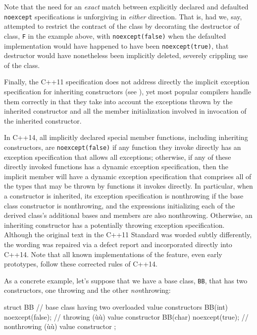\noindent Note that the need for an \emph{exact} match between explicitly declared
and defaulted \lstinline!noexcept! specifications is unforgiving in
\emph{either} direction. That is, had we, say, attempted to restrict the
contract of the class by decorating the destructor of class, \lstinline!F!
in the example above, with \lstinline!noexcept(false)! when the defaulted
implementation would have happened to have been \lstinline!noexcept(true)!,
that destructor would have nonetheless been implicitly deleted, severely
crippling use of the class.

Finally, the C++11 specification does not address directly the implicit
exception specification for inheriting constructors (see
), yet most popular compilers
handle them correctly in that they take into account the exceptions
thrown by the inherited constructor and all the member initialization
involved in invocation of the inherited constructor.

In C++14, all implicitly declared special member functions, including
inheriting constructors, are \lstinline!noexcept(false)! if any function
they invoke directly has an exception specification that allows all
exceptions; otherwise, if any of these directly invoked functions has a
dynamic exception specification, then the implicit member will have a
dynamic exception specification that comprises all of the types that may
be thrown by functions it invokes directly. In particular, when a
constructor is inherited, its exception specification is nonthrowing if
the base class constructor is nonthrowing, and the expressions
initializing each of the derived class's additional bases and members
are also nonthrowing. Otherwise, an inheriting constructor has a
potentially throwing exception specification. Although the original text
in the C++11 Standard was worded subtly differently, the wording was
repaired via a defect report and incorporated directly into C++14. Note
that all known implementations of the feature, even early prototypes,
follow these corrected rules of C++14.

As a concrete example, let's suppose that we have a base class,
\lstinline!BB!, that has two  constructors, one throwing and
the other \emph{non}throwing:

\begin{emcppslisting}
struct BB  // base class having two overloaded value constructors
{
    BB(int)  noexcept(false);  //    throwing (ù{}ù)  value constructor
    BB(char) noexcept(true);   // nonthrowing (ù{}ù) value constructor
};
\end{emcppslisting}
    

